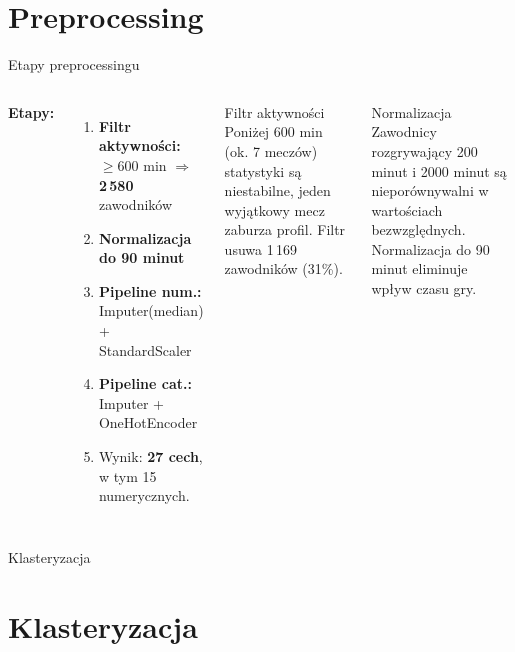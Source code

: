 \documentclass[aspectratio=169]{beamer}
\begin{document}

\section{Preprocessing}

\begin{frame}[fragile]{Etapy preprocessingu}
    \begin{columns}
        \textbf{Etapy:}
        \begin{enumerate}
            \item \textbf{Filtr aktywności:} $\geq 600$ min $\Rightarrow$ \textbf{2\,580} zawodników
            \item \textbf{Normalizacja do 90 minut}
            \item \textbf{Pipeline num.:} Imputer(median) + StandardScaler
            \item \textbf{Pipeline cat.:} Imputer + OneHotEncoder
            \item Wynik: \textbf{27 cech}, w tym 15 numerycznych.
        \end{enumerate}
        \begin{block}{Filtr aktywności}
            Poniżej 600 min (ok. 7 meczów) statystyki są niestabilne, jeden wyjątkowy mecz zaburza profil. Filtr usuwa 1\,169 zawodników (31\%).
        \end{block}
        \begin{block}{Normalizacja}
            Zawodnicy rozgrywający 200 minut i 2000 minut są nieporównywalni w wartościach bezwzględnych. Normalizacja do 90 minut eliminuje wpływ czasu gry.
        \end{block}

    \end{columns}
\end{frame}


\begin{frame}[c]
    \centering
    \vfill
    { Klasteryzacja}
    \vfill
\end{frame}

\section{Klasteryzacja}
\end{document}
